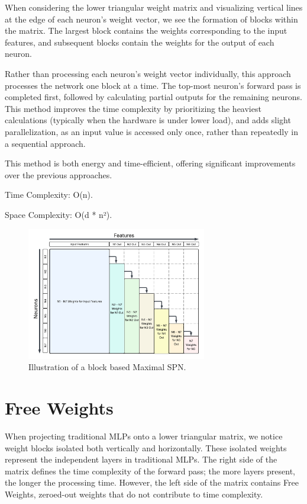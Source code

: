 When considering the lower triangular weight matrix and visualizing vertical lines at the edge of each neuron’s weight vector, we see the formation of blocks within the matrix. The largest block contains the weights corresponding to the input features, and subsequent blocks contain the weights for the output of each neuron.
 
Rather than processing each neuron’s weight vector individually, this approach processes the network one block at a time. The top-most neuron’s forward pass is completed first, followed by calculating partial outputs for the remaining neurons. This method improves the time complexity by prioritizing the heaviest calculations (typically when the hardware is under lower load), and adds slight parallelization, as an input value is accessed only once, rather than repeatedly in a sequential approach.

This method is both energy and time-efficient, offering significant improvements over the previous approaches.

Time Complexity: O(n).

Space Complexity: O(d * n²).

\begin{figure}[ht]
\centering
\includegraphics[width=0.7\textwidth]{Figures/Methodology/Block_Based_Maximal_SPN_Weights.png}
\caption{Illustration of a block based Maximal SPN.}
\label{fig:blockMaxSpn}
\end{figure}

\section{Free Weights}

When projecting traditional MLPs onto a lower triangular matrix, we notice weight blocks isolated both vertically and horizontally. These isolated weights represent the independent layers in traditional MLPs. The right side of the matrix defines the time complexity of the forward pass; the more layers present, the longer the processing time. However, the left side of the matrix contains Free Weights, zeroed-out weights that do not contribute to time complexity.
 
